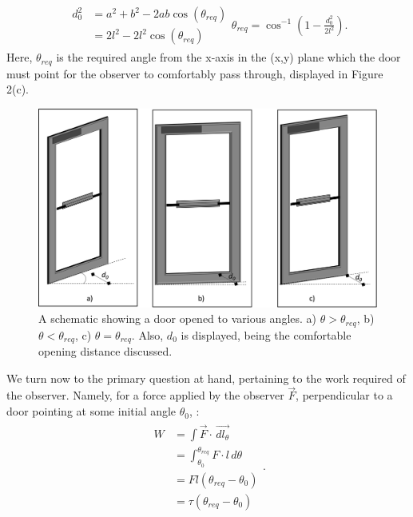     \begin{eqnarray}
    \begin{split}
        d_{0}^{2} & =a^{2}+b^{2}-2ab\cos(\theta_{req}) \\
        & = 2l^{2}-2l^{2}\cos(\theta_{req})
    \end{split}
    \theta_{req}=\cos^{-1}(1-\frac{d_{0}^{2}}{2l^{2}}).
    \end{eqnarray}
    Here, $\theta_{req}$ is the required angle from the x-axis in the (x,y) plane which the door must point for the observer to comfortably pass through, displayed in Figure 2(c). \par
    \begin{figure}[htp]
    \centering
    \includegraphics[width=\linewidth]{figures/Figure 2 - Angles.png}    
    \caption{A schematic showing a door opened to various angles. a) $\theta>\theta_{req}$, b) $\theta<\theta_{req}$, c) $\theta=\theta_{req}$. Also, $d_{0}$ is displayed, being the comfortable opening distance discussed.}
    \end{figure}
    We turn now to the primary question at hand, pertaining to the work required of the observer. Namely, for a force applied by the observer $\vec{F}$, perpendicular to a door pointing at some initial angle $\theta_{0}$, :
    \begin{eqnarray}
    \begin{split}
        W & =\int \Vec{F}\cdot \,\vec{dl_{\theta}}\\
        & =\int_{\theta_{0}}^{\theta_{req}} F\cdot l \,d\theta\\
        & = Fl(\theta_{req}-\theta_{0})\\
        & = \tau (\theta_{req}-\theta_{0})
    \end{split}.
    \end{eqnarray} \par
